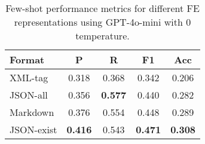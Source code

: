 \begin{table}
    \centering
    \begin{tabular}{lcccc}
        \hline
        \textbf{Format} & \textbf{P} & \textbf{R} & \textbf{F1} & \textbf{Acc} \\ 
        \hline
        XML-tag & 0.318 & 0.368 & 0.342 & 0.206 \\ 
        JSON-all & 0.356 & \textbf{0.577} & 0.440 & 0.282 \\ 
        Markdown & 0.376 & 0.554 & 0.448 & 0.289 \\ 
        JSON-exist & \textbf{0.416} & 0.543 & \textbf{0.471} & \textbf{0.308} \\ 
        \hline
    \end{tabular}
    \caption{Few-shot performance metrics for different FE representations using GPT-4o-mini with 0 temperature.}
    \label{tab:representation_performance}
\end{table}




